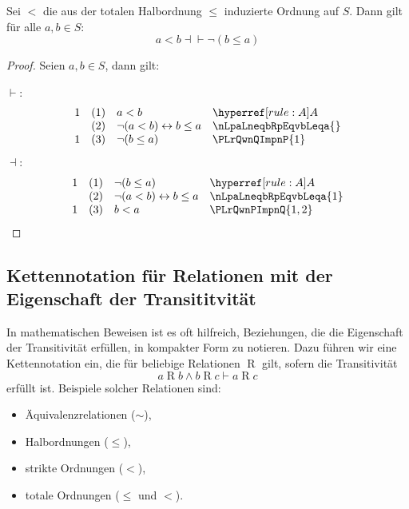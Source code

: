 \documentclass[main.tex]{subfiles}
\begin{document}
\label{aLneqbEqvnLpbLeqaRp}
\begin{theorem}
    Sei \(<\) die aus der totalen Halbordnung \(\leq\) induzierte Ordnung auf \(S\). Dann gilt für alle \(a,b\in S\):
    \[
    a<b\dashv\vdash \neg(b\leq a)
    \]
\end{theorem}
\begin{proof}
        Seien \(a,b\in S\), dann gilt:
        
\(\vdash\):
	\[
        \begin{array}{llll}
          1 & (1) &   a<b  & \rA\\
            & (2) &  \neg(a<b)\leftrightarrow b\leq a  & \nLpaLneqbRpEqvbLeqa{}\\
          1 & (3) &  \neg(b\leq a)  & \PLrQwnQImpnP{1}\\
        \end{array}
	\]
\(\dashv\):
 	\[
        \begin{array}{llll}
            1 & (1) &   \neg(b\leq a)  & \rA\\        
              & (2) &   \neg(a<b)\leftrightarrow b\leq a  &   \nLpaLneqbRpEqvbLeqa{1}   \\
            1 & (3) &   b<a                 &   \PLrQwnPImpnQ{1,2}\\
        \end{array}
	\]
\end{proof}


\subsection{Kettennotation für Relationen mit der Eigenschaft der Transititvität}

In mathematischen Beweisen ist es oft hilfreich, Beziehungen, die die Eigenschaft der Transitivität erfüllen, in kompakter Form zu notieren. Dazu führen wir eine Kettennotation ein, die für beliebige Relationen \(\mathrel{R}\) gilt, sofern die Transitivität 
\[
a \mathrel{R} b \land b \mathrel{R} c \vdash a \mathrel{R} c
\]
erfüllt ist. Beispiele solcher Relationen sind:
\begin{itemize}
    \item Äquivalenzrelationen (\(\sim\)),
    \item Halbordnungen (\(\leq\)),
    \item strikte Ordnungen (\(<\)),
    \item totale Ordnungen (\(\leq\) und \(<\)).
\end{itemize}
\end{document}
